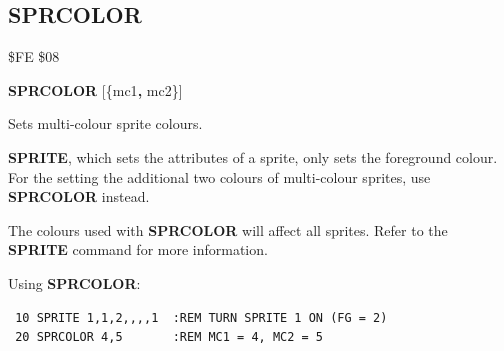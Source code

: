 \subsection{SPRCOLOR}
\begin{description}[leftmargin=2cm,style=nextline]
\item [Token:] \$FE \$08
\item [Format:] {\bf SPRCOLOR} [\{mc1{\bf,} mc2\}]
\item [Usage:]  Sets multi-colour sprite colours.

                {\bf SPRITE}, which sets the
                attributes of a sprite, only sets the foreground
                colour. For the setting the additional two colours
                of multi-colour sprites, use {\bf SPRCOLOR} instead.

\item [Remarks:] The colours used with {\bf SPRCOLOR} will affect all sprites.
                 Refer to the {\bf SPRITE} command for more information.

\item [Example:] Using {\bf SPRCOLOR}:
\begin{tcolorbox}[colback=black,coltext=white]
\verbatimfont{\codefont}
\begin{verbatim}
 10 SPRITE 1,1,2,,,,1  :REM TURN SPRITE 1 ON (FG = 2)
 20 SPRCOLOR 4,5       :REM MC1 = 4, MC2 = 5
\end{verbatim}
\end{tcolorbox}
\end{description}


\newpage
